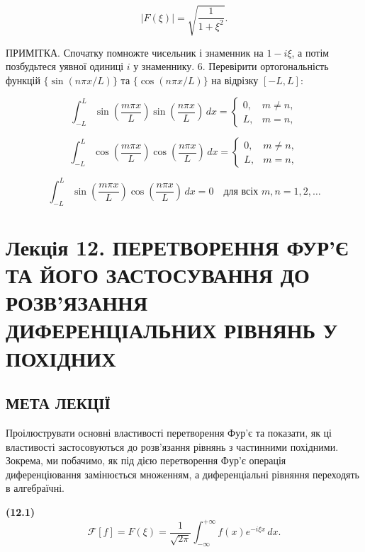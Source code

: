 \documentclass[
  ukrainian,
]{article}
\begin{document}
\[
\left|F(\xi)\right| = \sqrt{\frac{1}{1+\xi^2}}.
\]

ПРИМІТКА. Спочатку помножте чисельник і знаменник на \(1-i\xi\), а потім
позбудьтеся уявної одиниці \(i\) у знаменнику. 6. Перевірити
ортогональність функцій \(\{\sin(n\pi x/L)\}\) та \(\{\cos(n\pi x/L)\}\)
на відрізку \([-L,L]\):

\[
\int_{-L}^{L} \sin\!\left(\frac{m\pi x}{L}\right)\sin\!\left(\frac{n\pi x}{L}\right)\,dx =
\begin{cases}
0, & m \neq n,\\
L, & m = n,
\end{cases}
\]

\[
\int_{-L}^{L} \cos\!\left(\frac{m\pi x}{L}\right)\cos\!\left(\frac{n\pi x}{L}\right)\,dx =
\begin{cases}
0, & m \neq n,\\
L, & m = n,
\end{cases}
\]

\[
\int_{-L}^{L} \sin\!\left(\frac{m\pi x}{L}\right)\cos\!\left(\frac{n\pi x}{L}\right)\,dx = 0
\quad \text{для всіх } m,n=1,2,\dots
\]

\section{Лекція 12. ПЕРЕТВОРЕННЯ ФУР'Є ТА ЙОГО ЗАСТОСУВАННЯ ДО
РОЗВ'ЯЗАННЯ ДИФЕРЕНЦІАЛЬНИХ РІВНЯНЬ У
ПОХІДНИХ}\label{ux43bux435ux43aux446ux456ux44f-12.-ux43fux435ux440ux435ux442ux432ux43eux440ux435ux43dux43dux44f-ux444ux443ux440ux454-ux442ux430-ux439ux43eux433ux43e-ux437ux430ux441ux442ux43eux441ux443ux432ux430ux43dux43dux44f-ux434ux43e-ux440ux43eux437ux432ux44fux437ux430ux43dux43dux44f-ux434ux438ux444ux435ux440ux435ux43dux446ux456ux430ux43bux44cux43dux438ux445-ux440ux456ux432ux43dux44fux43dux44c-ux443-ux43fux43eux445ux456ux434ux43dux438ux445}

\subsection{МЕТА
ЛЕКЦІЇ}\label{ux43cux435ux442ux430-ux43bux435ux43aux446ux456ux457}

Проілюструвати основні властивості перетворення Фур'є та показати, як ці
властивості застосовуються до розв'язання рівнянь з частинними
похідними. Зокрема, ми побачимо, як під дією перетворення Фур'є операція
диференціювання замінюється множенням, а диференціальні рівняння
переходять в алгебраїчні.

\textbf{(12.1)} \[
\mathcal{F}[f] = F(\xi) = \frac{1}{\sqrt{2\pi}} \int_{-\infty}^{+\infty} f(x)e^{-i\xi x}\,dx.
\]
\end{document}
